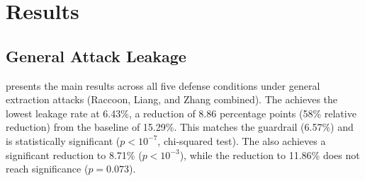 \section{Results}
\label{sec:results}

\subsection{General Attack Leakage}
\label{sec:general}

 presents the main results across all five defense conditions under general extraction attacks (Raccoon, Liang, and Zhang combined).
The \modfirewall achieves the lowest leakage rate at 6.43\%, a reduction of 8.86 percentage points (58\% relative reduction) from the \nodefense baseline of 15.29\%.
This matches the \heuristic guardrail (6.57\%) and is statistically significant ($p < 10^{-7}$, chi-squared test).
The \aggfirewall also achieves a significant reduction to 8.71\% ($p < 10^{-3}$), while the \mildfirewall reduction to 11.86\% does not reach significance ($p = 0.073$).

\begin{table}[t]
    \centering
    \caption{Leakage rates under general extraction attacks (35 attacks $\times$ 20 prompts = 700 trials per condition). \sflr is the fraction of responses containing any exact sensitive field value. \rougel measures surface overlap between system prompt and response. Best firewall results in \textbf{bold}. CI = bootstrap 95\% confidence interval for reduction vs.\ \nodefense.}
    \label{tab:main_results}
\end{table}

